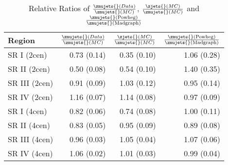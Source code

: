 \begin{table}[]
\centering
\caption{Relative Ratios of $\frac{\zmujets{}(Data)}{\zmujets{}(MC)}$, 
$\frac{\zjets{}(MC)}{\zmujets{}(MC)}$ 
and $\frac{\zmujets{}(\textnormal{Powheg})}{\zmujets{}(\textnormal{Madgraph})}$}
\label{tab:z_ratios}
\begin{tabular}{|l|r|r|r|}
\hline
Region       &  $\frac{\zmujets{}(Data)}{\zmujets{}(MC)}$ & $\frac{\zjets{}(MC)}{\zmujets{}(MC)}$ & $\frac{\zmujets{}(\textnormal{Powheg})}{\zmujets{}(\textnormal{Madgraph})}$  \\ \hline
SR I   (2cen)  & 0.73 (0.14) & 0.35 (0.10) & 1.06 (0.28)\\ \hline
SR II  (2cen)  & 0.50 (0.08) & 0.54 (0.10) & 1.40 (0.35)\\ \hline
SR III (2cen)  & 0.91 (0.09) & 1.03 (0.12) & 0.95 (0.14)\\ \hline
SR IV  (2cen)  & 1.16 (0.07) & 1.14 (0.08) & 0.97 (0.09)\\ \hline
SR I   (4cen)  & 0.82 (0.06) & 0.74 (0.08) & 1.00 (0.11)\\ \hline
SR II  (4cen)  & 0.83 (0.05) & 0.95 (0.09) & 0.89 (0.08)\\ \hline
SR III (4cen)  & 0.96 (0.03) & 1.05 (0.04) & 1.07 (0.06)\\ \hline
SR IV  (4cen)  & 1.06 (0.02) & 1.01 (0.03) & 0.99 (0.04)\\ \hline

\end{tabular}
\end{table}


